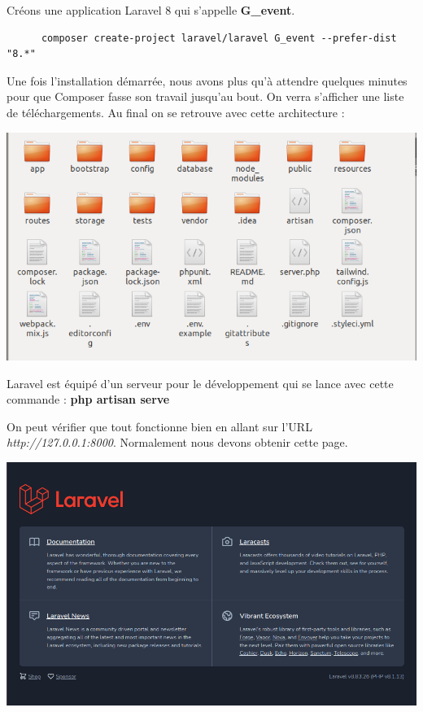 \documentclass[12pt,a4paper]{article}
\begin{document}
Créons une application Laravel 8 qui s’appelle \textbf{G\_event}.

\begin{verbatim}
      composer create-project laravel/laravel G_event --prefer-dist "8.*"
\end{verbatim}

Une fois l'installation démarrée, nous avons plus qu'à attendre quelques minutes pour que Composer fasse son travail jusqu'au bout. On verra s'afficher une liste de téléchargements. Au final on se retrouve avec cette architecture :

\begin{center}
\includegraphics[scale=0.7]{img/groot.png}
\end{center}

Laravel est équipé d'un serveur pour le développement qui se lance avec cette commande :
\textbf{php artisan serve}

On peut vérifier que tout fonctionne bien en allant sur l'URL \textit{http://127.0.0.1:8000}. Normalement nous devons obtenir cette page.

\begin{center}
\includegraphics[scale=0.5]{img/laravel_home.png}
\end{center}
\end{document}
